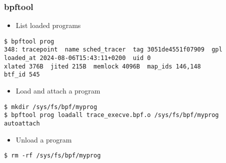 \begin{frame}[fragile]
  \frametitle{bpftool}
  \begin{itemize}
    \item List loaded programs
  \end{itemize}
  \begin{block}{}
    \fontsize{10}{10}\selectfont
    \begin{verbatim}
$ bpftool prog
348: tracepoint  name sched_tracer  tag 3051de4551f07909  gpl
loaded_at 2024-08-06T15:43:11+0200  uid 0
xlated 376B  jited 215B  memlock 4096B  map_ids 146,148
btf_id 545
    \end{verbatim}
  \end{block}
  \begin{itemize}
    \item Load and attach a program
  \end{itemize}
  \begin{block}{}
    \fontsize{10}{10}\selectfont
    \begin{verbatim}
$ mkdir /sys/fs/bpf/myprog
$ bpftool prog loadall trace_execve.bpf.o /sys/fs/bpf/myprog autoattach
    \end{verbatim}
  \end{block}
  \begin{itemize}
    \item Unload a program
  \end{itemize}
  \begin{block}{}
    \fontsize{10}{10}\selectfont
    \begin{verbatim}
$ rm -rf /sys/fs/bpf/myprog
    \end{verbatim}
  \end{block}
\end{frame}


